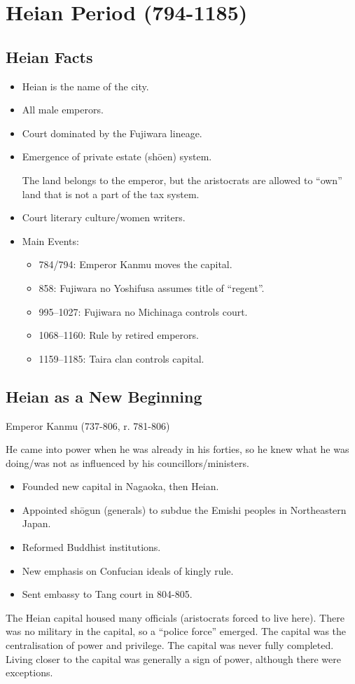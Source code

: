 \documentclass[class=article, crop=false]{standalone}
\begin{document}
  \section{Heian Period (794-1185)}
  \subsection{Heian Facts}
  \begin{itemize}
    \item Heian is the name of the city.
    \item All male emperors.
    \item Court dominated by the Fujiwara lineage.
    \item Emergence of private estate (sh\=oen) system.
    \begin{note}{}
      The land belongs to the emperor, but the aristocrats are allowed to ``own'' land that is not a part of the tax system.
    \end{note}
    \item Court literary culture/women writers.
    \item Main Events:
    \begin{itemize}
      \item 784/794: Emperor Kanmu moves the capital.
      \item 858: Fujiwara no Yoshifusa assumes title of ``regent''.
      \item 995--1027: Fujiwara no Michinaga controls court.
      \item 1068--1160: Rule by retired emperors.
      \item 1159--1185: Taira clan controls capital.
    \end{itemize}
  \end{itemize}
  \subsection{Heian as a New Beginning}
  Emperor Kanmu (737-806, r. 781-806)
  \begin{note}{}
    He came into power when he was already in his forties, so he knew what he was doing/was not as influenced by his councillors/ministers.
  \end{note}
  \begin{itemize}
    \item Founded new capital in Nagaoka, then Heian.
    \item Appointed sh\=ogun (generals) to subdue the Emishi peoples in Northeastern Japan.
    \item Reformed Buddhist institutions.
    \item New emphasis on Confucian ideals of kingly rule.
    \item Sent embassy to Tang court in 804-805.
  \end{itemize}
  The Heian capital housed many officials (aristocrats forced to live here). There was no military in the capital, so a ``police force'' emerged. The capital was the centralisation of power and privilege. The capital was never fully completed. Living closer to the capital was generally a sign of power, although there were exceptions.
\end{document}
